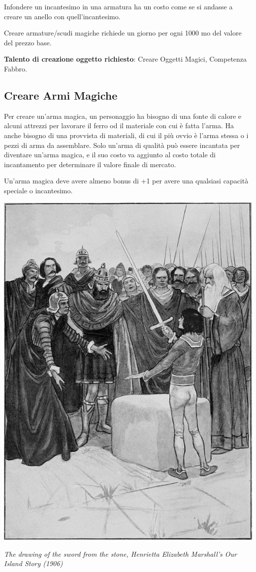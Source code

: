 \begin{multicols}{2}
Infondere un incantesimo in una armatura ha un costo come se si andasse a creare un anello con quell'incantesimo.

Creare armature/scudi magiche richiede un giorno per ogni 1000 mo del valore del prezzo base.

\textbf{Talento di creazione oggetto richiesto}: Creare Oggetti Magici, Competenza Fabbro.

\subsection{Creare Armi Magiche}\label{crearearmimagiche}

Per creare un'arma magica, un personaggio ha bisogno di una fonte di calore e alcuni attrezzi per lavorare il ferro od il materiale con cui è fatta l'arma. Ha anche bisogno di una provvista di materiali, di cui il più ovvio è l'arma stessa o i pezzi di arma da assemblare. Solo un'arma di qualità può essere incantata per diventare un'arma magica, e il suo costo va aggiunto al costo totale di incantamento per determinare il valore finale di mercato.

Un'arma magica deve avere almeno bonus di +1 per avere una qualsiasi capacità speciale o incantesimo.

\medskip

\begin{center}
\includegraphics[width=0.6\linewidth]{immagini/exacaliburfuori.png}

\emph{The drawing of the sword from the stone, Henrietta Elizabeth Marshall's Our Island Story (1906)}
\end{center}


\end{multicols}
